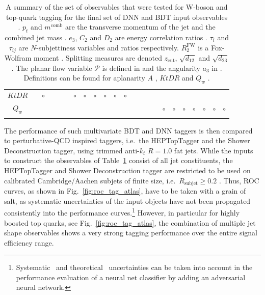 \begin{table}[tp]
\begin{tabular}{ c| c c c c c c c c c |c c|| c c c c c c c c c |c c| }
\multicolumn{1}{|c||}{$KtDR$}         &     & $\circ$ &     &     &     & $\circ$ & $\circ$ & $\circ$ & $\circ$ & $\circ$ & $\circ$ &     &     &     &     &     &     &     &     &     &     & \\
\multicolumn{1}{|c||}{$Q_w$}           &     &     &     &     &     &     &     &     &     &     &     &     &     &     &     & $\circ$ & $\circ$ & $\circ$ & $\circ$ & $\circ$ & $\circ$ & $\circ$   \\
\hhline{|-||-|-|-|-|-|-|-|-|-|-|-||-|-|-|-|-|-|-|-|-|-|-}
\end{tabular}
\caption{%
A summary of the set of observables that were 
tested for W-boson and top-quark tagging for the final set of DNN and BDT input observables \cite{Aaboud:2018psm}. $p_t$ and $m^{\mathrm{comb}}$ are the transverse momentum of the jet and the combined jet mass \cite{ATLAS:2016vmy}. $e_3$, $C_2$ and $D_2$ are energy correlation ratios \cite{Larkoski:2013eya, Larkoski:2014gra}. $\tau_i$ and $\tau_{ij}$ are $N$-subjettiness variables and ratios respectively. $R_2^{\mathrm{FW}}$ is a Fox-Wolfram moment \cite{Fox:1978vu}. Splitting measures are denoted $z_\mathrm{cut}$, $\sqrt{d_{12}}$ and $\sqrt{d_{23}}$ \cite{Thaler:2008ju, Aad:2013ueu}. The planar flow variable $\mathcal{P}$ is defined in \cite{Almeida:2008tp} and the angularity $a_3$ in \cite{Aad:2012meb}. Definitions can be found for aplanarity $A$ \cite{Chen:2011ah}, $KtDR$ \cite{Catani:1993hr} and $Q_w$ \cite{Thaler:2008ju}.}\label{tab:obs}
\end{table}
%
The performance of such multivariate BDT and DNN taggers is then
compared to perturbative-QCD inspired taggers, i.e.\ the HEPTopTagger
and the Shower Deconstruction tagger, using trimmed anti-$k_t$ $R=1.0$
fat jets. While the inputs to construct the observables of
Table~\ref{tab:obs} consist of all jet constituents, the HEPTopTagger
and Shower Deconstruction tagger are restricted to be used on
calibrated Cambridge/Aachen subjets of finite size, i.e.\
$R_\mathrm{subjet} \geq 0.2$ . Thus, ROC curves, as shown in
Fig.~\ref{fig:roc_tag_atlas}, have to be taken with a grain of salt,
as systematic uncertainties of the input objects have not been
propagated consistently into the performance
curves.\footnote{Systematic~\cite{Louppe:2016ylz, Shimmin:2017mfk} and
  theoretical~\cite{Englert:2018cfo} uncertainties can be taken into
  account in the performance evaluation of a neural net classifier by
  adding an adversarial neural network.} However, in particular for
highly boosted top quarks, see Fig.~\ref{fig:roc_tag_atlas}, the combination of multiple jet shape observables shows a very strong tagging performance over the entire signal efficiency range.

